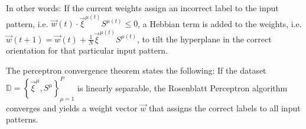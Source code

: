 In other words: If the current weights assign an incorrect label to the input pattern, i.e. \(\vec{w}(t)\cdot\vec{\xi}^{\mu(t)}S^{\mu(t)} \leq 0\), a Hebbian term is added to the weights, i.e. \(\vec{w}(t + 1) = \vec{w}(t) + \frac{1}{N}\vec{\xi}^{\mu(t)}S^{\mu(t)}\), to tilt the hyperplane in the correct orientation for that particular input pattern.

The perceptron convergence theorem\cite{perceptron_slides1} states the following:
If the dataset \(\mathbb{D} = \left\{ \vec{\xi}^\mu, S^\mu \right\} _{\mu=1}^{P}\) is linearly separable, the Rosenblatt Perceptron algorithm converges and yields a weight vector \(\vec{w}\) that assigns the correct labels to all input patterns.